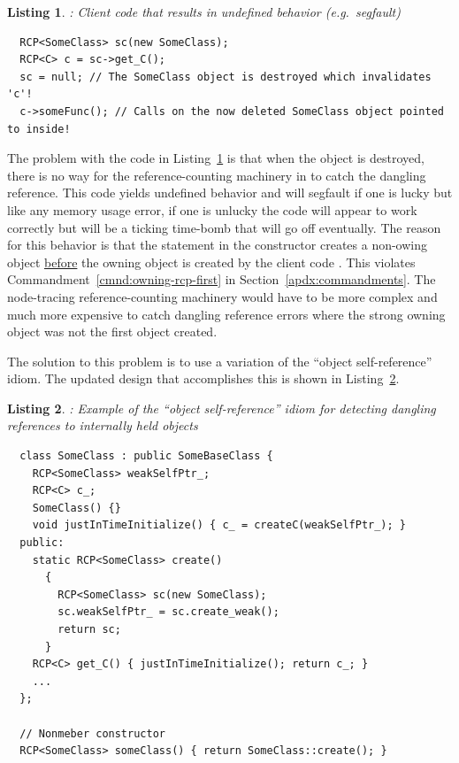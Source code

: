\documentclass[pdf,ps2pdf,11pt]{SANDreport}
\newtheorem{listing}{Listing}
\begin{document}
{}\begin{listing}: Client code that results in undefined behavior
(e.g.\ segfault) \\
\label{listing:osr:bad-use-SomeClass}
{\small\begin{verbatim}
  RCP<SomeClass> sc(new SomeClass);
  RCP<C> c = sc->get_C();
  sc = null; // The SomeClass object is destroyed which invalidates 'c'!
  c->someFunc(); // Calls on the now deleted SomeClass object pointed to inside!
\end{verbatim}}
\end{listing}


The problem with the code in
Listing~\ref{listing:osr:bad-use-SomeClass} is that when the
{} object {} is destroyed, there is no way for
the reference-counting machinery in to catch the dangling reference.
This code yields undefined behavior and will segfault if one is lucky
but like any memory usage error, if one is unlucky the code will
appear to work correctly but will be a ticking time-bomb that will go
off eventually.  The reason for this behavior is that the statement
{} in the constructor
{} creates a non-owing {} object
{}\underline{before} the owning {} object is created by
the client code {}.  This
violates Commandment~\ref{cmnd:owning-rcp-first} in
Section~\ref{apdx:commandments}.  The node-tracing reference-counting
machinery would have to be more complex and much more expensive to
catch dangling reference errors where the strong owning
{} object was not the first {} object
created.

The solution to this problem is to use a variation of the ``object
self-reference'' idiom.  The updated design that accomplishes this is
shown in Listing~\ref{listing:osr:SomeClass-refactored}.


\begin{listing}:  Example of the ``object self-reference'' idiom for
detecting dangling references to internally held objects  \\
\label{listing:osr:SomeClass-refactored}
{\small\begin{verbatim}
  class SomeClass : public SomeBaseClass {
    RCP<SomeClass> weakSelfPtr_;
    RCP<C> c_;
    SomeClass() {}
    void justInTimeInitialize() { c_ = createC(weakSelfPtr_); }
  public:
    static RCP<SomeClass> create()
      {
        RCP<SomeClass> sc(new SomeClass);
        sc.weakSelfPtr_ = sc.create_weak();
        return sc;
      }
    RCP<C> get_C() { justInTimeInitialize(); return c_; }
    ...
  };

  // Nonmeber constructor
  RCP<SomeClass> someClass() { return SomeClass::create(); }
\end{verbatim}}
\end{listing}
\end{document}
